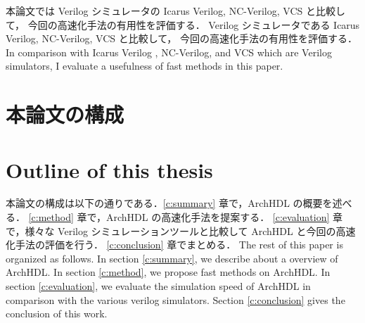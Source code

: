 本論文では Verilog シミュレータの Icarus Verilog, NC-Verilog, VCS と比較して，
今回の高速化手法の有用性を評価する．
Verilog シミュレータである Icarus Verilog, NC-Verilog, VCS と比較して，
今回の高速化手法の有用性を評価する．
\fi
In comparison with Icarus Verilog , NC-Verilog, and VCS which are Verilog simulators, I evaluate a usefulness of fast methods in this paper.

\section{本論文の構成}
\fi
\section{Outline of this thesis}

本論文の構成は以下の通りである．\ref{c:summary} 章で，ArchHDL の概要を述べる．
\ref{c:method} 章で，ArchHDL の高速化手法を提案する．
\ref{c:evaluation} 章で，様々な Verilog シミュレーションツールと比較して ArchHDL と今回の高速化手法の評価を行う．
\ref{c:conclusion} 章でまとめる．
\fi
The rest of this paper is organized as follows.
In section \ref{c:summary}, we describe about a overview of ArchHDL.
In section \ref{c:method}, we propose fast methods on ArchHDL.
In section \ref{c:evaluation}, we evaluate the simulation speed of ArchHDL in comparison with the various verilog simulators.
Section \ref{c:conclusion} gives the conclusion of this work.
